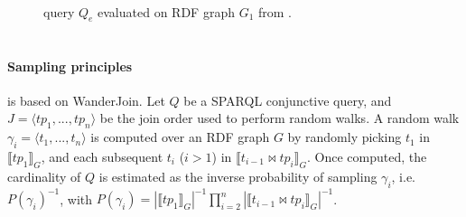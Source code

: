 

\begin{figure}[t]
  \centering
  \begin{minipage}{0.49\textwidth}
    \subfloat[$(Q_e)$]{
      
      \label{fig:q1-j2-1hop}
    } \\
  \end{minipage}
  \hfill
  \begin{minipage}{0.50\textwidth}
  \end{minipage}
  \caption{
    query $Q_e$  evaluated on RDF graph $G_1$ from \cite{10.1007/978-3-031-33455-9_3}.
  }
  \label{fig:random_walks_example}
\end{figure}



\section{\NAME}


\paragraph{Sampling principles}

\NAME is based on WanderJoin\cite{li2019wanderjoin}.
Let $Q$ be a SPARQL conjunctive query, and $J = \langle tp_1, ..., tp_n \rangle$ be
the join order used to perform random walks. A random walk
$\gamma_i = \langle t_1, ..., t_n\rangle$ is computed over
an RDF graph $G$ by randomly picking $t_1$ in $\llbracket tp_1 \rrbracket_G$,
and each subsequent $t_i$ ($i > 1$) in $\llbracket t_{i-1} \bowtie tp_i \rrbracket_G$.
Once computed, the cardinality of $Q$ is estimated as the inverse probability
of sampling $\gamma_i$, i.e. $P(\gamma_i)^{-1}$, with $P(\gamma_i) = |\llbracket tp_1 \rrbracket_G|^{-1} \prod_{i=2}^{n}
|\llbracket t_{i-1} \bowtie tp_i \rrbracket_G|^{-1}$.

